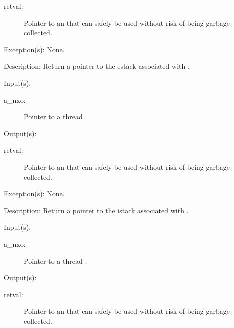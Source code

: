 \begin{capi}
\begin{capilist}
\begin{description}
		\item[retval: ]
			Pointer to an  that can safely be used
			without risk of being garbage collected.
		\end{description}
	\item[Exception(s): ] None.
	\item[Description: ]
		Return a pointer to the estack associated with .
	\end{capilist}
\label{nxo_thread_istack_get}
	\begin{capilist}
	\item[Input(s): ]
		\begin{description}\item[]
		\item[a\_nxo: ]
			Pointer to a thread .
		\end{description}
	\item[Output(s): ]
		\begin{description}\item[]
		\item[retval: ]
			Pointer to an  that can safely be used
			without risk of being garbage collected.
		\end{description}
	\item[Exception(s): ] None.
	\item[Description: ]
		Return a pointer to the istack associated with .
	\end{capilist}
\label{nxo_thread_tstack_get}
	\begin{capilist}
	\item[Input(s): ]
		\begin{description}\item[]
		\item[a\_nxo: ]
			Pointer to a thread \classname{nxo}.
		\end{description}
	\item[Output(s): ]
		\begin{description}\item[]
		\item[retval: ]
			Pointer to an  that can safely be used
			without risk of being garbage collected.
		\end{description}

\end{capilist}
\end{capi}
